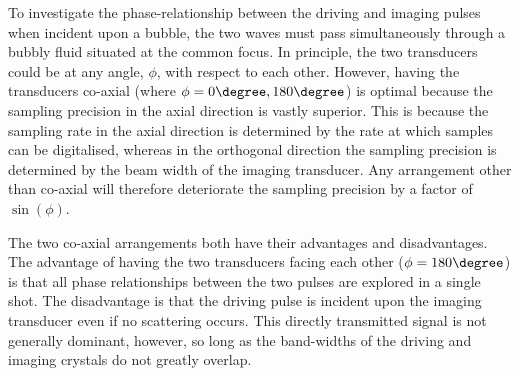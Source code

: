 
To investigate the phase-relationship between the driving and imaging pulses
when incident upon a bubble,
the two waves must pass simultaneously through a bubbly fluid situated at the common focus.
In principle, the two transducers could be at any angle, $\phi$, with respect to each other.
However, having the transducers co-axial (where $\phi = 0\degree,180\degree$) is optimal because
the sampling precision in the axial direction is vastly superior. %
This is because the sampling rate in the axial direction is determined by the rate at which samples can be digitalised, 
whereas in the orthogonal direction the sampling precision  is determined by the beam width of the imaging transducer.
Any arrangement other than co-axial will therefore deteriorate the sampling precision by a factor of $\sin(\phi)$.

The two co-axial arrangements both have their advantages and disadvantages.
The advantage of having the two transducers facing each other ($\phi = 180\degree$) 
is that all phase relationships between the two pulses are explored in a single shot.
The disadvantage is that the driving pulse is incident upon the imaging transducer even if no scattering occurs.
This directly transmitted signal is not generally dominant, however, so long as the  band-widths of the driving and imaging crystals do not greatly overlap.

